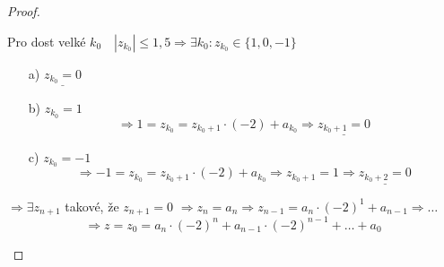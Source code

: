 \documentclass[czech,bachelor,dept470,male]{diploma}
\begin{document}
\begin{proof}
\begin{enumerate}
		Pro dost velké $k_0 \quad |z_{k_0}|\le1,5 \Rightarrow \exists k_0:z_{k_0}\in\{1,0,-1\}$
		\begin{enumerate}
			\item[a)] $\underline{z_{k_0}=0}$
			\item[b)]$z_{k_0}=1$
			$$\Rightarrow 1=z_{k_0}=z_{k_0+1}\cdot(-2)+a_{k_0}\Rightarrow \underline{z_{k_0+1}=0}$$
			\item[c)]$z_{k_0}=-1$
			$$\Rightarrow -1=z_{k_0}=z_{k_0+1}\cdot(-2)+a_{k_0}\Rightarrow z_{k_0+1}=1\Rightarrow \underline{z_{k_0+2}=0}$$ 
		\end{enumerate}
		$\Rightarrow \exists z_{n+1}$ takové, že $z_{n+1}=0$\newline
		$\Rightarrow z_n = a_n \Rightarrow z_{n-1}=a_n\cdot(-2)^1+a_{n-1}\Rightarrow \dots$
		$$\Rightarrow z=z_0=a_n\cdot(-2)^n+a_{n-1}\cdot(-2)^{n-1}+\dots+a_0$$
	\end{enumerate}
\end{proof}
\end{document}
